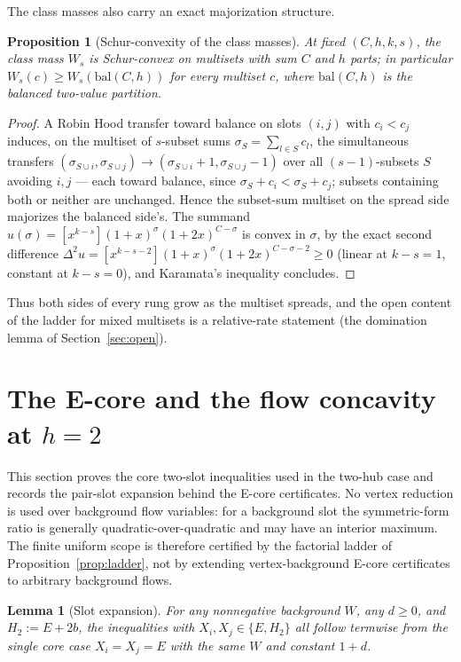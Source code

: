 \documentclass[11pt]{article}
\newtheorem{lemma}[theorem]{Lemma}
\newtheorem{proposition}[theorem]{Proposition}
\theoremstyle{definition}
\begin{document}
The class masses also carry an exact majorization structure.

\begin{proposition}[Schur-convexity of the class masses]
\label{prop:wschur}
At fixed $(C,h,k,s)$, the class mass $W_s$ is Schur-convex on
multisets with sum $C$ and $h$ parts; in particular
$W_s(c)\ge W_s(\mathrm{bal}(C,h))$ for every multiset $c$, where
$\mathrm{bal}(C,h)$ is the balanced two-value partition.
\end{proposition}

\begin{proof}
A Robin Hood transfer toward balance on slots $(i,j)$ with
$c_i<c_j$ induces, on the multiset of $s$-subset sums
$\sigma_S=\sum_{l\in S}c_l$, the simultaneous transfers
$(\sigma_{S\cup i},\sigma_{S\cup j})\to(\sigma_{S\cup
i}{+}1,\sigma_{S\cup j}{-}1)$ over all $(s{-}1)$-subsets $S$
avoiding $i,j$ --- each toward balance, since
$\sigma_S+c_i<\sigma_S+c_j$; subsets containing both or neither
are unchanged.  Hence the subset-sum multiset on the spread side
majorizes the balanced side's.  The summand
$u(\sigma)=[x^{k-s}](1+x)^\sigma(1+2x)^{C-\sigma}$ is convex in
$\sigma$, by the exact second difference
$\Delta^2u=[x^{k-s-2}](1+x)^\sigma(1+2x)^{C-\sigma-2}\ge0$ (linear
at $k{-}s{=}1$, constant at $k{-}s{=}0$), and Karamata's inequality
concludes.
\end{proof}

Thus both sides of every rung grow as the multiset spreads, and
the open content of the ladder for mixed multisets is a
relative-rate statement (the domination lemma of
Section~\ref{sec:open}).

\section{The E-core and the flow concavity at
\texorpdfstring{$h=2$}{h=2}}\label{sec:p6}

This section proves the core two-slot inequalities used in the
two-hub case and records the pair-slot expansion behind the E-core
certificates.  No vertex reduction is used over background flow
variables: for a background slot the symmetric-form ratio is generally
quadratic-over-quadratic and may have an interior maximum.  The
finite uniform scope is therefore certified by the factorial ladder
of Proposition~\ref{prop:ladder}, not by extending vertex-background
E-core certificates to arbitrary background flows.

\begin{lemma}[Slot expansion]\label{lem:slot}
For any nonnegative background $W$, any $d\ge0$, and $H_2:=E+2b$, the
inequalities with $X_i,X_j\in\{E,H_2\}$ all follow termwise from the
single core case $X_i=X_j=E$ with the same $W$ and constant $1+d$.
\end{lemma}
\end{document}
